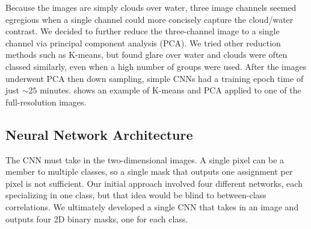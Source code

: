 Because the images are simply clouds over water, three image channels seemed egregious when a single channel could more concisely capture the cloud/water contrast. We decided to further reduce the three-channel image to a single channel via principal component analysis (PCA). We tried other reduction methods such as K-means, but found glare over water and clouds were often classed similarly, even when a high number of groups were used. After the images underwent PCA then down sampling, simple CNNs had a training epoch time of just \(\sim25\) minutes.  shows an example of K-means and PCA applied to one of the full-resolution images. 

\subsection{Neural Network Architecture}
The CNN must take in the two-dimensional images. A single pixel can be a member to multiple classes, so a single mask that outputs one assignment per pixel is not sufficient. Our initial approach involved four different networks, each specializing in one class, but that idea would be blind to between-class correlations. We ultimately developed a single CNN that takes in an image and outputs four 2D binary masks, one for each class. 

